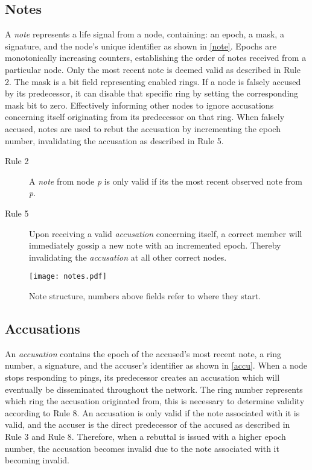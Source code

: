 \documentclass[USenglish]{uit-thesis}
\begin{document}
\subsection{Notes}
A \textit{note} represents a life signal from a node, containing: an epoch, a mask, a signature, and the node's unique identifier as shown in \autoref{note}.
Epochs are monotonically increasing counters, establishing the order of notes received from a particular node.
Only the most recent note is deemed valid as described in Rule 2.
The mask is a bit field representing enabled rings. 
If a node is falsely accused by its predecessor, it can disable that specific ring by setting the corresponding mask bit to zero. 
Effectively informing other nodes to ignore accusations concerning itself originating from its predecessor on that ring.
When falsely accused, notes are used to rebut the accusation by incrementing the epoch number, invalidating the accusation as described in Rule 5.

\begin{description}
	\item[Rule 2] A \textit{note} from node \textit{p} is only valid if its the most recent observed note from \textit{p}.
	\item[Rule 5] Upon receiving a valid \textit{accusation} concerning itself, a correct member will immediately gossip a new note with an incremented epoch.
	Thereby invalidating the \textit{accusation} at all other correct nodes.
\end{description}

\begin{figure}[h]
	\centering
	\texttt{[image: notes.pdf]}
	\caption[Note structure.]{Note structure, numbers above fields refer to where they start.}
	\label{note}
\end{figure}


\subsection{Accusations}
An \textit{accusation} contains the epoch of the accused's most recent note, a ring number, a signature, and the accuser's identifier as shown in \autoref{accu}.
When a node stops responding to pings, its predecessor creates an accusation which will eventually be disseminated throughout the network.
The ring number represents which ring the accusation originated from, this is necessary to determine validity according to Rule 8.
An accusation is only valid if the note associated with it is valid, and the accuser is the direct predecessor of the accused as described in Rule 3 and Rule 8. 
Therefore, when a rebuttal is issued with a higher epoch number, the accusation becomes invalid due to the note associated with it becoming invalid.
\end{document}
